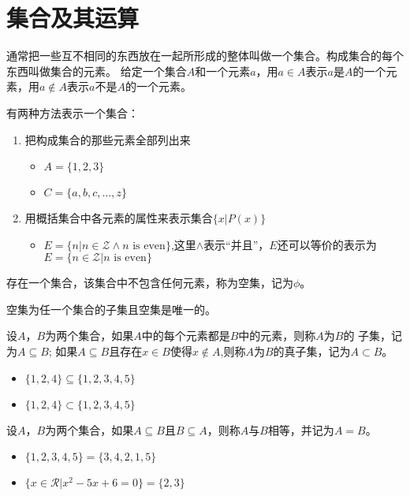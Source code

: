 \chapter{集合及其运算}


  \begin{Def}
    通常把一些互不相同的东西放在一起所形成的整体叫做一个集合。构成集合的每个东西叫做集合的元素。
给定一个集合$A$和一个元素$a$，用$a \in A$表示$a$是$A$的一个元素，用$a \notin A$表示$a$不是$A$的一个元素。
  \end{Def}

  有两种方法表示一个集合：
\begin{enumerate}
\item 把构成集合的那些元素全部列出来
  \begin{itemize}
  \item $A = \{1, 2, 3\}$
\item $C = \{a, b, c, \ldots, z\}$
  \end{itemize}
\item 用概括集合中各元素的属性来表示集合$\{x|P(x)\}$
\begin{itemize}
\item $E = \{n|n \in \mathcal{Z} \land n\text{ is even}\}$,这里$\land$表示“并且”，$E$还可以等价的表示为$E = \{n \in \mathcal{Z} | n\text{ is even}\}$
\end{itemize}
\end{enumerate}

存在一个集合，该集合中不包含任何元素，称为空集，记为$\phi$。
  \begin{Thm}
   空集为任一个集合的子集且空集是唯一的。 
  \end{Thm}

  
    \begin{Def}
    设$A$，$B$为两个集合，如果$A$中的每个元素都是$B$中的元素，则称$A$为$B$的
子集，记为$A \subseteq B$; 如果$A \subseteq B$且存在$x\in B$使得$x \notin A$,则称$A$为$B$的真子集，记为$A\subset B$。    
\end{Def}
\begin{itemize}
  \item   $\{1,2,4\} \subseteq \{1,2,3,4,5\}$
\item $\{1,2,4\} \subset \{1,2,3,4,5\}$
  \end{itemize}

    \begin{Def}
    设$A$，$B$为两个集合，如果$A \subseteq B$且$B \subseteq A$，则称$A$与$B$相等，并记为$A=B$。
  \end{Def}
    \begin{itemize}
  \item   $\{1,2,3,4,5\} = \{3,4,2,1,5\}$
\item $\{x \in \mathcal{R} | x^2 -5x + 6 = 0\} = \{2,3\}$
  \end{itemize}

